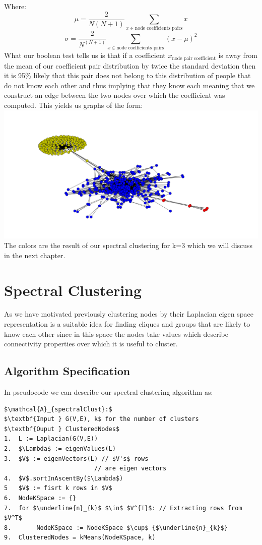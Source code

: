 \documentclass[10pt,twocolumn]{article}
\begin{document}
Where: $$\mu = \frac{2}{N(N+1)}\sum_{x \in \text{node coefficients pairs} } x$$  $$\sigma = \frac{2}{N^(N+1)}\sum_{x \in \text{node coefficients pairs} } (x- \mu)^{2}$$
What our boolean test tells us is that if a coefficient $x_{\text{node pair coefficient}}$ is away from the mean of our coefficient pair distribution by twice the standard deviation then it is 95\%  likely that this pair does not belong to this distribution of people that do not know each other and thus implying that they know each meaning that we construct an edge between the two nodes over which the coefficient was computed. This yields us graphs of the form:
\hspace*{-2cm}
\includegraphics[scale=0.2]{pics/spring.png}
The colors are the result of our spectral clustering
for k=3 which we will discuss in the next chapter.
\section{Spectral Clustering}
As we have motivated previously clustering nodes by their Laplacian eigen space representation is a suitable idea for finding cliques and groups that are likely to know each other since in this space the nodes take values which describe connectivity properties over which it is useful to cluster.
\subsection{Algorithm Specification}
In pseudocode we can describe our spectral clustering algorithm as:
\begin{lstlisting}[mathescape]
$\mathcal{A}_{spectralClust}:$
$\textbf{Input } G(V,E), k$ for the number of clusters
$\textbf{Ouput } ClusteredNodes$
1.  L := Laplacian(G(V,E))
2.  $\Lambda$ := eigenValues(L)
3.  $V$ := eigenVectors(L) // $V's$ rows
                         // are eigen vectors
4.  $V$.sortInAscentBy($\Lambda$)
5   $V$ := fisrt k rows in $V$
6.  NodeKSpace := {}
7.  for $\underline{n}_{k}$ $\in$ $V^{T}$: // Extracting rows from $V^T$
8.       NodeKSpace := NodeKSpace $\cup$ {$\underline{n}_{k}$}
9.  ClusteredNodes = kMeans(NodeKSpace, k)
\end{lstlisting}
\end{document}

